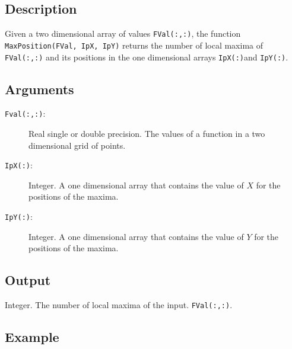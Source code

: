 \subsection{Description}

Given a two dimensional array of values \texttt{FVal(:,:)}, the
function \texttt{MaxPosition(FVal, IpX, IpY)} returns the number of
local maxima of \texttt{FVal(:,:)} and its positions in the one
dimensional arrays \texttt{IpX(:)}and \texttt{IpY(:)}.

\subsection{Arguments}

\begin{description}
\item[\texttt{Fval(:,:)}:] Real single or double precision. The values
  of a function in a two dimensional grid of points.

\item[\texttt{IpX(:)}:] Integer. A one dimensional array that contains
  the value of $X$ for the positions of the maxima.

\item[\texttt{IpY(:)}:] Integer. A one dimensional array that contains
  the value of $Y$ for the positions of the maxima.

\end{description}

\subsection{Output}

Integer. The number of local maxima of the input.
\texttt{FVal(:,:)}. 

\subsection{Example}

